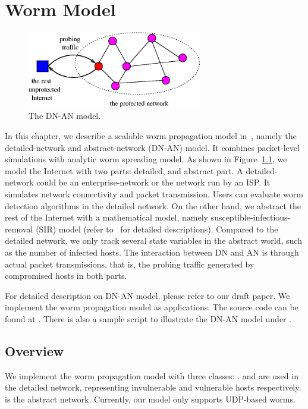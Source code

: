 \chapter{Worm Model}
\label{chap:worm}

\begin{figure}[tb] 
  \centerline{\includegraphics [width=3in] {figures/dn-an.eps}}
  \caption{\small The DN-AN model.}
  \label{fig:dn-an}
\end{figure}

In this chapter,
  we describe a scalable worm propagation model in~\ns,
  namely the detailed-network and abstract-network (DN-AN) model.
It combines packet-level simulations with analytic worm spreading model.
As shown in Figure~\ref{fig:dn-an},
  we model the Internet with two parts: detailed, and abstract part.
A detailed-network could be an enterprise-network or the network run by an ISP.
It simulates network connectivity and packet transmission.
Users can evaluate worm detection algorithms in the detailed network.
On the other hand,
  we abstract the rest of the Internet with a mathematical model,
  namely susceptible-infectious-removal (SIR) model
  (refer to~\cite{Hethcote00inf} for detailed descriptions).
Compared to the detailed network,
  we only track several state variables in the abstract world,
  such as the number of infected hosts.
The interaction between DN and AN is through actual packet transmissions,
  that is, the probing traffic generated by compromised hosts in
  both parts.

For detailed description on DN-AN model,
  please refer to our draft paper.
We implement the worm propagation model as applications.
The source code can be found at .
There is also a sample script to illustrate the DN-AN model under
  .

\section{Overview}
\label{sec:worm:overview}

We implement the worm propagation model with three classes:
  . 
 and  are used in the detailed network,
  representing invulnerable and vulnerable hosts respectively.
 is the abstract network.
Currently,
  our model only supports UDP-based worms.

